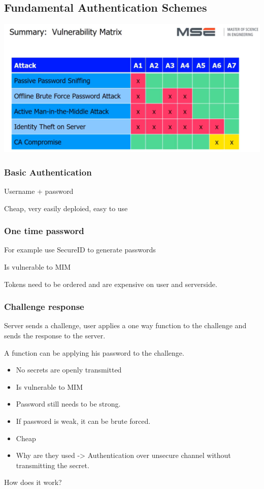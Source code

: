 \documentclass[12pt]{article}
\begin{document}
\subsection*{Fundamental Authentication Schemes}
\includegraphics[width=\textwidth]{VulnerabilityMatrix.png}
\subsubsection*{Basic Authentication}
Username + password

Cheap, very easily deploied, easy to use
\subsubsection*{One time password}
For example use SecureID to generate passwords

Is vulnerable to MIM

Tokens need to be ordered and are expensive on user and serverside.
\subsubsection*{Challenge response}
Server sends a challenge, user applies a one way function to the challenge and sends the response to the server.

A function can be applying his password to the challenge.
\begin{itemize}
    \item No secrets are openly transmitted
    \item Is vulnerable to MIM
    \item Password still needs to be strong.
    \item If password is weak, it can be brute forced.
    \item Cheap
    \item Why are they used -> Authentication over unsecure channel without transmitting the secret.
\end{itemize}
How does it work?
\end{document}
